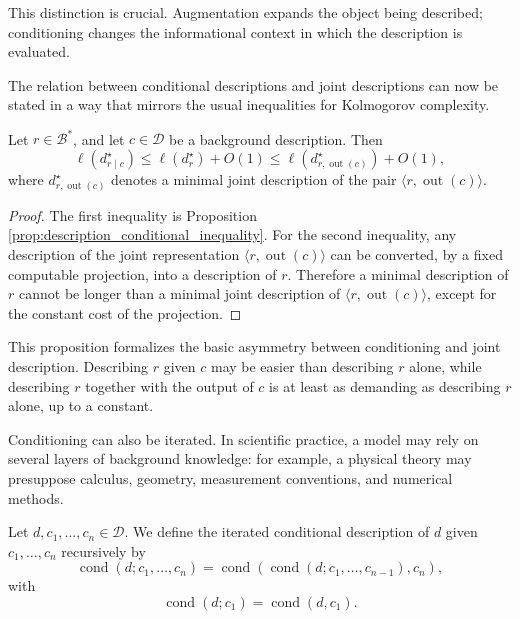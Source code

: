 This distinction is crucial. Augmentation expands the object being described;
conditioning changes the informational context in which the description is
evaluated.

The relation between conditional descriptions and joint descriptions can now
be stated in a way that mirrors the usual inequalities for Kolmogorov
complexity.

\begin{proposition}
\label{prop:description_conditional_joint}
Let \(r\in\mathcal B^\ast\), and let \(c\in\mathcal D\) be a background
description. Then
\[
\ell(d^\star_{r\mid c})
\leq
\ell(d^\star_r)+O(1)
\leq
\ell(d^\star_{r,\operatorname{out}(c)})+O(1),
\]
where \(d^\star_{r,\operatorname{out}(c)}\) denotes a minimal joint description
of the pair \(\langle r,\operatorname{out}(c)\rangle\).
\end{proposition}

\begin{proof}
The first inequality is Proposition
\ref{prop:description_conditional_inequality}. For the second inequality, any
description of the joint representation
\(\langle r,\operatorname{out}(c)\rangle\) can be converted, by a fixed
computable projection, into a description of \(r\). Therefore a minimal
description of \(r\) cannot be longer than a minimal joint description of
\(\langle r,\operatorname{out}(c)\rangle\), except for the constant cost of the
projection.
\end{proof}

This proposition formalizes the basic asymmetry between conditioning and joint
description. Describing \(r\) given \(c\) may be easier than describing \(r\)
alone, while describing \(r\) together with the output of \(c\) is at least as
demanding as describing \(r\) alone, up to a constant.

Conditioning can also be iterated. In scientific practice, a model may rely on
several layers of background knowledge: for example, a physical theory may
presuppose calculus, geometry, measurement conventions, and numerical methods.

\begin{definition}
\label{def:multiple_conditioning}
Let \(d,c_1,\ldots,c_n\in\mathcal D\). We define the iterated conditional
description of \(d\) given \(c_1,\ldots,c_n\) recursively by
\[
\operatorname{cond}(d;c_1,\ldots,c_n)
=
\operatorname{cond}(
\operatorname{cond}(d;c_1,\ldots,c_{n-1}),c_n),
\]
with
\[
\operatorname{cond}(d;c_1)=\operatorname{cond}(d,c_1).
\]
\end{definition}

